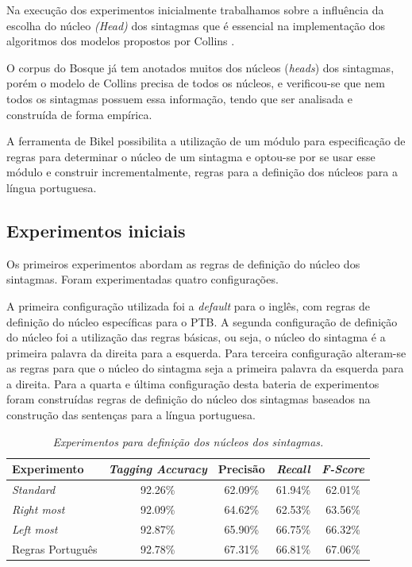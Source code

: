 Na execução dos experimentos inicialmente trabalhamos sobre a influência da escolha do núcleo \emph{(Head)} dos sintagmas que é essencial na implementação dos algoritmos dos modelos propostos por Collins \cite{collins99}.

O corpus do Bosque já tem anotados muitos dos núcleos (\emph{heads}) dos sintagmas, porém o modelo de Collins precisa de todos os núcleos, e verificou-se que nem todos os sintagmas possuem essa informação, tendo que ser analisada e construída de forma empírica.

A ferramenta de Bikel possibilita a utilização de um módulo para especificação de regras para determinar o núcleo de um sintagma e optou-se por se usar esse módulo e construir incrementalmente, regras para a definição dos núcleos para a língua portuguesa.

\subsection{Experimentos iniciais}
\label{sec:configuracoes}

Os primeiros experimentos abordam as regras de definição do núcleo dos sintagmas. Foram experimentadas quatro configurações.

A primeira configuração utilizada foi a \emph{default} para o inglês, com regras de definição do núcleo específicas para o PTB. A segunda configuração de definição do núcleo foi a utilização das regras básicas, ou seja, o núcleo do sintagma é a primeira palavra da direita para a esquerda. Para terceira configuração alteram-se as regras para que o núcleo do sintagma seja a primeira palavra da esquerda para a direita. Para a quarta e última configuração desta bateria de experimentos foram construídas regras de definição do núcleo dos sintagmas baseados na construção das sentenças para a língua portuguesa.

\begin{table}[H]
\centering
   \footnotesize
\caption{\it Experimentos para definição dos núcleos dos sintagmas.}
	
	\begin{tabular}{|l|c|c|c|c|}
		\hline
		\textbf{Experimento} &  \textbf{\emph{Tagging Accuracy}} & \textbf{Precisão} & \textbf{\emph{Recall}} & \textbf{\emph{F-Score}} \\
		\hline
		\emph{Standard} & 92.26\% & 62.09\% & 61.94\% & 62.01\%\\
		\hline		
		\emph{Right most} & 92.09\% & 64.62\% & 62.53\% & 63.56\%\\
		\hline		
		\emph{Left most} & 92.87\% & 65.90\% & 66.75\% & 66.32\%\\
		\hline		
		Regras Português & 92.78\% & 67.31\% & 66.81\% & 67.06\%\\
		\hline
	\end{tabular}
	\label{tab:primeiro_experimento}
\end{table}


